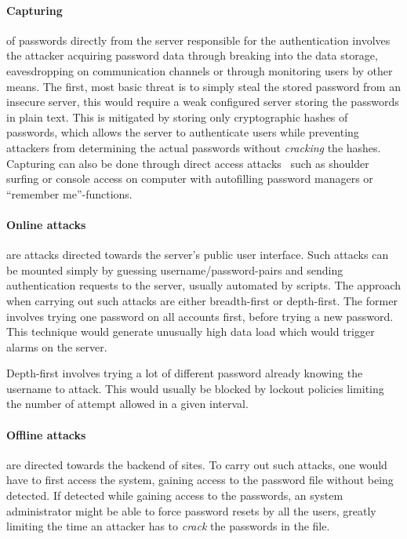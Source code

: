\paragraph{Capturing} of passwords directly from the server responsible for the authentication involves the attacker acquiring password data through breaking into the data storage, eavesdropping on communication channels or through monitoring users by other means. The first, most basic threat is to simply steal the stored password from an insecure server, this would require a weak configured server storing the passwords in plain text. This is mitigated by storing only cryptographic hashes of passwords, which allows the server to authenticate users while preventing attackers from determining the actual passwords without \emph{cracking} the hashes. Capturing can also be done through direct access attacks~\cite{guide-pws} such as shoulder surfing or console access on computer with autofilling password managers or ``remember me''-functions.

\paragraph{Online attacks} are attacks directed towards the server's public user interface. Such attacks can be mounted simply by guessing username/password-pairs and sending authentication requests to the server, usually automated by scripts. The approach when carrying out such attacks are either breadth-first or depth-first. The former involves trying one password on all accounts first, before trying a new password. This technique would generate unusually high data load which would trigger alarms on the server. 
\par Depth-first involves trying a lot of different password already knowing the username to attack. This would usually be blocked by lockout policies limiting the number of attempt allowed in a given interval.

\paragraph{Offline attacks} are directed towards the backend of sites. To carry out such attacks, one would have to first access the system, gaining access to the password file without being detected. If detected while gaining access to the passwords, an system administrator might be able to force password resets by all the users, greatly limiting the time an attacker has to \emph{crack} the passwords in the file.

